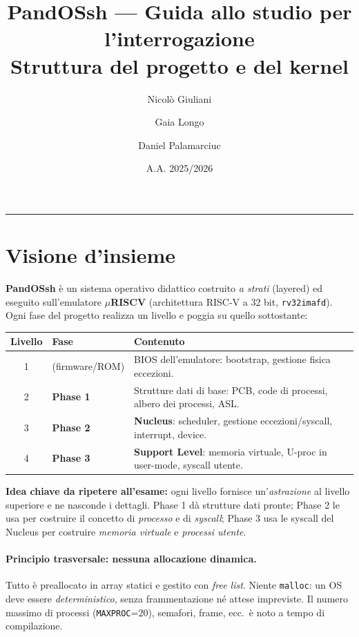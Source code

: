 \documentclass[11pt,a4paper]{article}
\title{\textbf{PandOSsh — Guida allo studio per l'interrogazione}\\[2pt]
\large Struttura del progetto e del kernel}
\author{Nicolò Giuliani \and Gaia Longo \and Daniel Palamarciuc}
\date{A.A. 2025/2026}
\newcommand{\code}[1]{\texttt{#1}}
\begin{document}
\maketitle
\tableofcontents
\bigskip
\hrule
\bigskip

\section{Visione d'insieme}

\textbf{PandOSsh} è un sistema operativo didattico costruito \emph{a strati}
(layered) ed eseguito sull'emulatore \textbf{$\mu$RISCV} (architettura RISC-V
a 32 bit, \code{rv32imafd}). Ogni fase del progetto realizza un livello e
poggia su quello sottostante:

\begin{center}
\begin{tabular}{@{}clp{8.4cm}@{}}
\toprule
\textbf{Livello} & \textbf{Fase} & \textbf{Contenuto} \\
\midrule
1 & (firmware/ROM) & BIOS dell'emulatore: bootstrap, gestione fisica eccezioni. \\
2 & \textbf{Phase 1} & Strutture dati di base: PCB, code di processi, albero dei processi, ASL. \\
3 & \textbf{Phase 2} & \textbf{Nucleus}: scheduler, gestione eccezioni/syscall, interrupt, device. \\
4 & \textbf{Phase 3} & \textbf{Support Level}: memoria virtuale, U-proc in user-mode, syscall utente. \\
\bottomrule
\end{tabular}
\end{center}

\textbf{Idea chiave da ripetere all'esame:} ogni livello fornisce
un'\emph{astrazione} al livello superiore e ne nasconde i dettagli. Phase 1 dà
strutture dati pronte; Phase 2 le usa per costruire il concetto di
\emph{processo} e di \emph{syscall}; Phase 3 usa le syscall del Nucleus per
costruire \emph{memoria virtuale} e \emph{processi utente}.

\paragraph{Principio trasversale: nessuna allocazione dinamica.}
Tutto è preallocato in array statici e gestito con \emph{free list}. Niente
\code{malloc}: un OS deve essere \emph{deterministico}, senza frammentazione né
attese impreviste. Il numero massimo di processi (\code{MAXPROC}=20), semafori,
frame, ecc.\ è noto a tempo di compilazione.
\end{document}
